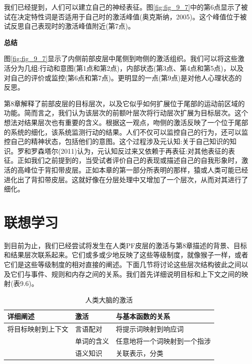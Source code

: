 我们已经提到，人们可以建立自己的神经表征。图\ref{fig:fig_9_7}中的第6点显示了被试在决定特性词是否适用于自己时的激活峰值(奥克斯纳，2005)。这个峰值位于被试反思自己表现时的激活峰值附近(第7点)。
\par
\textbf{总结}
\par
图\ref{fig:fig_9_7}显示了内侧前部皮层中尾侧到吻侧的激活组织。我们可以将这些激活分为几组:行动和意图(第1点和第2点)，内部状态(第3点、第4点和第5点)，以及对自己的评价或监控(第6点和第7点)。更明显的一点(第9点)是对他人心理状态的反思。
\par
第8章解释了前部皮层的目标层次，以及它似乎如何扩展位于尾部的运动前区域的功能。简而言之，我们认为该层次的前额叶层次将行动层次扩展为目标层次。这个想法对结果层次也有重要的含义。根据这一观点，吻侧的激活反映了一个位于尾部的系统的细化，该系统监测行动的结果。人们不仅可以监控自己的行为，还可以监控自己的精神状态，包括他们的意图。这个过程涉及元认知:关于自己知识的知识。罗和罗森塔尔(2011)认为，元认知反过来又依赖于再表征:对其他表征的表征。正如我们之前提到的，当受试者评价自己的表现或描述自己的自我形象时，激活的高峰位于背扣带皮层。正如本章的第一部分所表明的那样，猿或人类可能已经进化出了背扣带皮层。这就好像在分层处理中又增加了一个层次，从而对其进行了细化。
\section{联想学习}
\par
到目前为止，我们已经尝试将发生在人类PF皮层的激活与第8章描述的背景、目标和结果层次联系起来。它们或多或少地反映了这些等级制度，就像猴子一样，或者它们是这些等级制度的相对直接的阐述。下面几节将讨论这些层次结构彼此之间以及它们与事件、规则和内存之间的关系。我们首先详细说明目标和上下文之间的映射(表9.6)。
\begin{table}[htbp] 
	\newcommand{\tabincell}[2]{\begin{tabular}{@{}#1@{}}#2\end{tabular}} %
	\centering
	\caption{人类大脑的激活\label{tab:9_6}}
	\renewcommand\arraystretch{1.5}	%
	\begin{tabular}{lll}
		\toprule
		详细阐述 & 激活 & 与基本函数的关系\\
		\midrule
		将目标映射到上下文 & 言语配对 & 将提示词映射到响应词  \\
		& 单词的含义 & 任意地将一个词映射到一个指涉 \\
		& 语义知识 & 关联表示，分类 \\
		\bottomrule
		
	\end{tabular}%
\end{table}%

